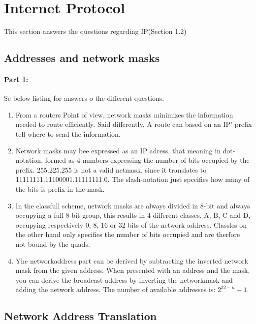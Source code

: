 \section{Internet Protocol}
This section answers the questions regarding IP(Section 1.2)

\subsection{Addresses and network masks}
\paragraph{Part 1: } Se below listing for answers o the different questions.

\begin{enumerate}
\item From a routers Point of view, network masks minimizes the information
needed to route efficiently. Said differently, A route can based on an IP'
prefix tell where to send the information.
\item Network masks may bee expressed as an IP adress, that meaning in
dot-notation, formed as 4 numbers expressing the number of bits occupied by the
prefix. 255.225.255 is not a valid netmask, since it translates to
11111111.11100001.11111111.0. The slash-notation just specifies how many of the
bits is prefix in the mask.
\item In the classfull scheme, network masks are always divided in 8-bit and
always occupying a full 8-bit group, this results in 4 different classes, A, B,
C and D, occupying respectively 0, 8, 16 or 32 bits of the network address.
Classles on the other hand only specifies the number of bits occupied and are
therfore not bound by the quads.
\item Yhe networkaddress part can be derived by subtracting the inverted
network mask from the given address. When presented with an address and the 
mask, you can derive the broadcast address by inverting the networkmask and 
adding the network address. The number of available addresses is: 
$2^{32 - n}-1$.
\end{enumerate}

\subsection{Network Address Translation}

